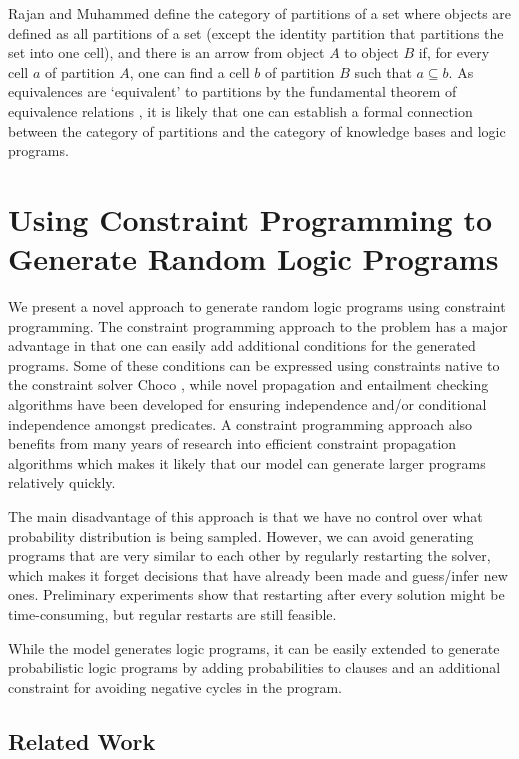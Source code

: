 \documentclass{article}
\begin{document}
Rajan and Muhammed \cite{rajan2015normal} define the category of partitions of a
set where objects are defined as all partitions of a set (except the identity
partition that partitions the set into one cell), and there is an arrow from
object $A$ to object $B$ if, for every cell $a$ of partition $A$, one can find a
cell $b$ of partition $B$ such that $a \subseteq b$. As equivalences are
`equivalent' to partitions by the fundamental theorem of equivalence relations
\cite{dummit2004abstract}, it is likely that one can establish a formal
connection between the category of partitions and the category of knowledge
bases and logic programs.

\section{Using Constraint Programming to Generate Random Logic Programs} \label{sec:2}

We present a novel approach to generate random logic programs using constraint
programming. The constraint programming approach to the problem has a major
advantage in that one can easily add additional conditions for the generated
programs. Some of these conditions can be expressed using constraints native to
the constraint solver Choco \cite{choco}, while novel propagation and entailment
checking algorithms have been developed for ensuring independence and/or
conditional independence amongst predicates. A constraint programming approach
also benefits from many years of research into efficient constraint propagation
algorithms which makes it likely that our model can generate larger programs
relatively quickly.

The main disadvantage of this approach is that we have no control over what
probability distribution is being sampled. However, we can avoid generating
programs that are very similar to each other by regularly restarting the solver,
which makes it forget decisions that have already been made and guess/infer new
ones. Preliminary experiments show that restarting after every solution might be
time-consuming, but regular restarts are still feasible.

While the model generates logic programs, it can be easily extended to generate
probabilistic logic programs by adding probabilities to clauses and an
additional constraint for avoiding negative cycles in the program.

\subsection{Related Work}
\end{document}
